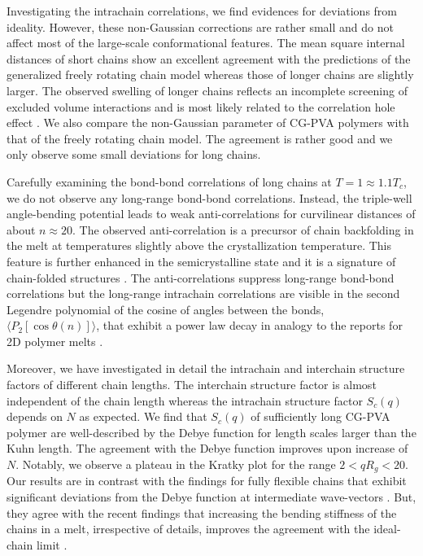 \documentclass[pre,showpacs,notitlepage,twocolumn]{revtex4-1}
\begin{document}
Investigating the intrachain correlations, we find evidences for deviations from ideality.  However, these non-Gaussian corrections   are rather small and do not affect most of 
the large-scale conformational features. The mean square internal distances of short chains  show an excellent agreement with  the predictions of the generalized freely rotating chain model \cite{Flory} whereas those of longer chains are slightly larger.   
The observed   swelling of longer chains reflects an incomplete screening of excluded volume interactions and is  most likely related to the  correlation hole effect \cite{polymerDeGennes,Wittmer2007a}. We also compare the non-Gaussian parameter of CG-PVA polymers with that of the freely rotating chain model. The agreement is rather good and we only observe some small deviations for long
chains. 


 
Carefully examining the bond-bond correlations of long chains at $T=1\approx 1.1T_c$, we do not observe any  long-range bond-bond correlations. 
Instead, the triple-well angle-bending potential leads to weak anti-correlations for  curvilinear distances of about $n \approx20 $.
The observed anti-correlation is a precursor of chain backfolding in the melt at temperatures slightly above the crystallization temperature. This feature is further enhanced  in the semicrystalline state  and it is  a signature of chain-folded structures \cite{Meyer2002,SaraLMC}.  The anti-correlations suppress  long-range bond-bond correlations but the long-range intrachain correlations are visible in the second Legendre polynomial of  the cosine of angles between the bonds, $\langle P_2[ \cos \theta(n)]\rangle $, that exhibit a power law decay in analogy to the reports for 2D polymer melts \cite{Meyer2010}.

 

 Moreover, we have investigated in detail the intrachain and interchain structure factors of different chain lengths. The interchain structure factor is almost independent of the chain length whereas the intrachain structure factor $S_c(q)$ depends
 on $N$ as expected.  We find that  $S_c(q)$ of sufficiently long  CG-PVA polymer are well-described by the Debye function for length scales larger than the Kuhn length. The agreement with the Debye function improves upon increase of $N$. Notably,
 we observe a plateau in the Kratky plot for the range $2< qR_g < 20$. Our  results  are in contrast with the findings for fully flexible chains that exhibit significant deviations from the Debye function at intermediate wave-vectors \cite{Wittmer2007a,
 formfactor2007,Hsu2014}. But, they agree with the recent findings that increasing the bending stiffness of the chains in a melt,  irrespective of details, improves the agreement with the 
 ideal-chain limit \cite{Kremer2016}.
 
\end{document}
